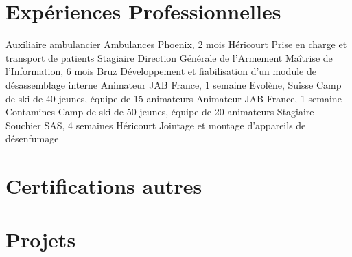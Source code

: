 \documentclass[10pt,a4paper,sans]{moderncv}
\begin{document}

	\vspace*{\deletedSpace}
	\section{Expériences Professionnelles}
			{Auxiliaire ambulancier}
			{Ambulances Phoenix, 2 mois}
			{Héricourt}
			{Prise en charge et transport de patients}
			{}
			{Stagiaire}
			{Direction Générale de l'Armement Maîtrise de l'Information, 6 mois}
			{Bruz}
			{Développement et fiabilisation d'un module de désassemblage interne}
			{}
			{Animateur}
			{JAB France, 1 semaine}
			{Evolène, Suisse}
			{Camp de ski de 40 jeunes, équipe de 15 animateurs}
			{}
			{Animateur}
			{JAB France, 1 semaine}
			{Contamines}
			{Camp de ski de 50 jeunes, équipe de 20 animateurs}
			{}
			{Stagiaire}
			{Souchier SAS, 4 semaines}
			{Héricourt}
			{Jointage et montage d'appareils de désenfumage}
			{}


	\vspace*{\deletedSpace}
	\section{Certifications autres}

	\newpage


	\vspace*{\deletedSpace}
	\section{Projets}
\end{document}
